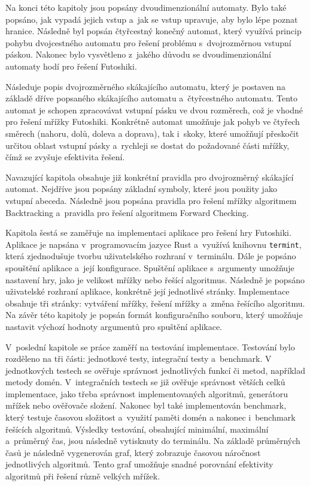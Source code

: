 Na konci této kapitoly jsou popsány dvoudimenzionální automaty. Bylo také
popsáno, jak vypadá jejich vstup a~jak se vstup upravuje, aby bylo lépe poznat
hranice. Následně byl popsán čtyřcestný konečný automat, který využívá princip
pohybu dvojcestného automatu pro řešení problému s~dvojrozměrnou vstupní
páskou. Nakonec bylo vysvětleno z~jakého důvodu se dvoudimenzionální automaty
hodí pro řešení Futoshiki.

Následuje popis dvojrozměrného skákajícího automatu, který je postaven na
základě dříve popsaného skákajícího automatu a~čtyřcestného automatu. Tento
automat je schopen zpracovávat vstupní pásku ve dvou rozměrech, což je vhodné
pro řešení mřížky Futoshiki. Konkrétně automat umožňuje jak pohyb ve čtyřech
směrech (nahoru, dolů, doleva a doprava), tak i~skoky, které umožňují
přeskočit určitou oblast vstupní pásky a~rychleji se dostat do požadované části
mřížky, čímž se zvyšuje efektivita řešení.

Navazující kapitola obsahuje již konkrétní pravidla pro dvojrozměrný skákající
automat. Nejdříve jsou popsány základní symboly, které jsou použity jako
vstupní abeceda. Následně jsou popsána pravidla pro řešení mřížky algoritmem
Backtracking a~pravidla pro řešení algoritmem Forward Checking.

Kapitola šestá se zaměřuje na implementaci aplikace pro řešení hry Futoshiki.
Aplikace je napsána v~programovacím jazyce Rust a~využívá knihovnu
\texttt{termint}, která zjednodušuje tvorbu uživatelského rozhraní v~terminálu.
Dále je popsáno spouštění aplikace a~její konfigurace. Spuštění aplikace
s~argumenty umožňuje nastavení hry, jako je velikost mřížky nebo řešící
algoritmus. Následně je popsáno uživatelské rozhraní aplikace, konkrétně její
jednotlivé stránky. Implementace obsahuje tři stránky: vytváření mřížky, řešení
mřížky a~změna řešícího algoritmu. Na závěr této kapitoly je popsán formát
konfiguračního souboru, který umožňuje nastavit výchozí hodnoty argumentů pro
spuštění aplikace.

V~poslední kapitole se práce zaměří na testování implementace. Testování bylo
rozděleno na tři části: jednotkové testy, integrační testy a~benchmark. V
jednotkových testech se ověřuje správnost jednotlivých funkcí či metod,
například metody domén. V~integračních testech se již ověřuje správnost větších
celků implementace, jako třeba správnost implementovaných algoritmů, generátoru
mřížek nebo ověřovače složení. Nakonec byl také implementován benchmark, který
testuje časovou složitost a~využití paměti domén a nakonec i~benchmark řešících
algoritmů. Výsledky testování, obsahující minimální, maximální a~průměrný čas,
jsou následně vytisknuty do terminálu. Na základě průměrných časů je následně
vygenerován graf, který zobrazuje časovou náročnost jednotlivých algoritmů.
Tento graf umožňuje snadné porovnání efektivity algoritmů při řešení různě
velkých mřížek.


%
